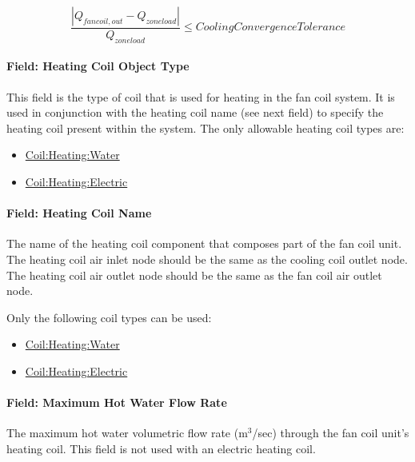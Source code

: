\begin{equation}
\frac{{\left| {{Q_{fancoil,out}} - {Q_{zoneload}}} \right|}}{{{Q_{zoneload}}}} \le CoolingConvergenceTolerance
\end{equation}

\paragraph{Field: Heating Coil Object Type}\label{field-heating-coil-object-type-003}

This field is the type of coil that is used for heating in the fan coil system. It is used in conjunction with the heating coil name (see next field) to specify the heating coil present within the system. The only allowable heating coil types are:

\begin{itemize}
\item
  \hyperref[coilheatingwater]{Coil:Heating:Water}
\item
  \hyperref[coilheatingelectric]{Coil:Heating:Electric}
\end{itemize}

\paragraph{Field: Heating Coil Name}\label{field-heating-coil-name-003}

The name of the heating coil component that composes part of the fan coil unit. The heating coil air inlet node should be the same as the cooling coil outlet node. The heating coil air outlet node should be the same as the fan coil air outlet node.

Only the following coil types can be used:

\begin{itemize}
\item
  \hyperref[coilheatingwater]{Coil:Heating:Water}
\item
  \hyperref[coilheatingelectric]{Coil:Heating:Electric}
\end{itemize}

\paragraph{Field: Maximum Hot Water Flow Rate}\label{field-maximum-hot-water-flow-rate-000}

The maximum hot water volumetric flow rate (m\(^{3}\)/sec) through the fan coil unit's heating coil. This field is not used with an electric heating coil.

